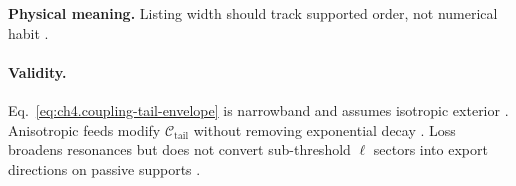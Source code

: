 \textbf{Physical meaning.} Listing width should track supported order, not numerical habit \cite{hansen1988}.

\paragraph{Validity.}
Eq.~\eqref{eq:ch4.coupling-tail-envelope} is narrowband and assumes isotropic exterior \cite{stratton1941}. Anisotropic feeds modify
\(\mathcal{C}_{\mathrm{tail}}\) without removing exponential decay \cite{harrington2001}. Loss broadens resonances but does not convert
sub-threshold \(\ell\) sectors into export directions on passive supports \cite{devaney2004,stratton1941}.

